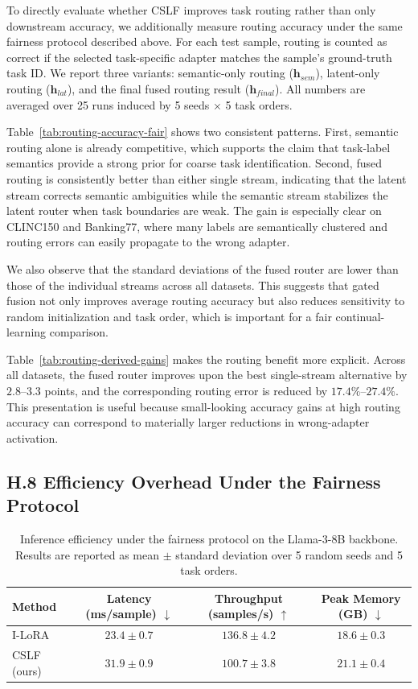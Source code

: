 \documentclass[11pt]{article}
\begin{document}
To directly evaluate whether CSLF improves task routing rather than only downstream accuracy, we additionally measure routing accuracy under the same fairness protocol described above. For each test sample, routing is counted as correct if the selected task-specific adapter matches the sample's ground-truth task ID. We report three variants: semantic-only routing ($\mathbf{h}_{sem}$), latent-only routing ($\mathbf{h}_{lat}$), and the final fused routing result ($\mathbf{h}_{final}$). All numbers are averaged over 25 runs induced by 5 seeds $\times$ 5 task orders.



Table~\ref{tab:routing-accuracy-fair} shows two consistent patterns. First, semantic routing alone is already competitive, which supports the claim that task-label semantics provide a strong prior for coarse task identification. Second, fused routing is consistently better than either single stream, indicating that the latent stream corrects semantic ambiguities while the semantic stream stabilizes the latent router when task boundaries are weak. The gain is especially clear on CLINC150 and Banking77, where many labels are semantically clustered and routing errors can easily propagate to the wrong adapter.

We also observe that the standard deviations of the fused router are lower than those of the individual streams across all datasets. This suggests that gated fusion not only improves average routing accuracy but also reduces sensitivity to random initialization and task order, which is important for a fair continual-learning comparison.



Table~\ref{tab:routing-derived-gains} makes the routing benefit more explicit. Across all datasets, the fused router improves upon the best single-stream alternative by $2.8$--$3.3$ points, and the corresponding routing error is reduced by $17.4\%$--$27.4\%$. This presentation is useful because small-looking accuracy gains at high routing accuracy can correspond to materially larger reductions in wrong-adapter activation.

\subsection*{H.8 Efficiency Overhead Under the Fairness Protocol}


\begin{table}[t]
\centering
\begin{tabular}{lccc}
\toprule
Method & Latency (ms/sample) $\downarrow$ & Throughput (samples/s) $\uparrow$ & Peak Memory (GB) $\downarrow$ \\
\midrule
I-LoRA & $23.4 \pm 0.7$ & $136.8 \pm 4.2$ & $18.6 \pm 0.3$ \\
CSLF (ours) & $31.9 \pm 0.9$ & $100.7 \pm 3.8$ & $21.1 \pm 0.4$ \\
\bottomrule
\end{tabular}
\caption{Inference efficiency under the fairness protocol on the Llama-3-8B backbone. Results are reported as mean $\pm$ standard deviation over 5 random seeds and 5 task orders.}
\label{tab:efficiency-fair}
\end{table}
\end{document}
